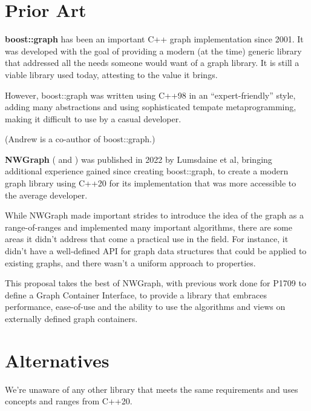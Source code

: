 \section{Prior Art}
\textbf{boost::graph} has been an important C++ graph implementation since 2001. It was developed with the goal of providing
a modern (at the time) generic library that addressed all the needs someone would want of a graph library. It is still a viable library used today, attesting to the value it brings.

However, boost::graph was written using C++98 in an ``expert-friendly'' style, adding many abstractions and using sophisticated tempate metaprogramming, making it difficult to use by a casual developer.

(Andrew is a co-author of boost::graph.)

\medskip

\textbf{NWGraph} (\cite{REF_nwgraph_library} and \cite{REF_nwgraph_paper}) was published in 2022
by Lumsdaine et al, bringing additional experience gained since creating boost::graph, to create a modern graph library using C++20 for its implementation 
that was more accessible to the average developer. %

While NWGraph made important strides to introduce the idea of the graph as a range-of-ranges and implemented many important algorithms,
there are some areas it didn't address that come a practical use in the field. For instance, it didn't have a well-defined API for graph
data structures that could be applied to existing graphs, and there wasn't a uniform approach to properties.

This proposal takes the best of NWGraph, with previous work done for P1709 to define a Graph Container Interface, to provide a library that
embraces performance, ease-of-use and the ability to use the algorithms and views on externally defined graph containers.

\section{Alternatives}
We're unaware of any other library that meets the same requirements and uses concepts and ranges from C++20.


